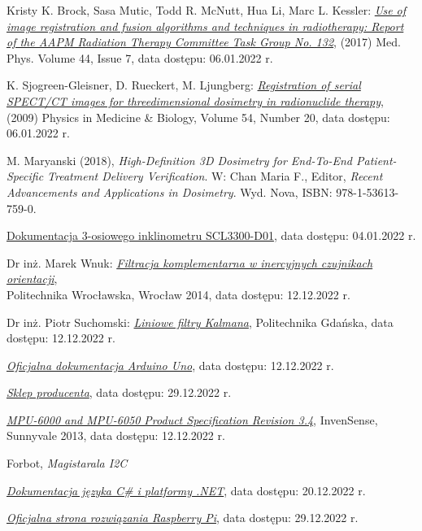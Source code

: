 
\begin{thebibliography}{3}
\small

Kristy K. Brock, Sasa Mutic, Todd R. McNutt, Hua Li, Marc L. Kessler: \href{https://aapm.onlinelibrary.wiley.com/doi/10.1002/mp.12256}{\emph{Use of image registration and fusion algorithms and techniques in radiotherapy: Report of the AAPM Radiation Therapy Committee Task Group No. 132}}, (2017) Med. Phys. Volume 44, Issue 7, data dostępu: 06.01.2022 r.

K. Sjogreen-Gleisner, D. Rueckert, M. Ljungberg: \href{https://iopscience.iop.org/article/10.1088/0031-9155/54/20/010/pdf}{\emph{Registration of serial SPECT/CT images for threedimensional dosimetry in radionuclide therapy}}, (2009) Physics in Medicine \& Biology, Volume 54, Number 20, data dostępu: 06.01.2022 r.

M. Maryanski (2018), \emph{High-Definition 3D Dosimetry for End-To-End Patient-Specific Treatment Delivery Verification}. W: Chan Maria F., Editor, \emph{Recent Advancements and Applications in Dosimetry}. Wyd. Nova, ISBN: 978-1-53613-759-0.

\href{https://www.mouser.pl/datasheet/2/281/1/datasheet_scl3300_d01-1532018.pdf}{Dokumentacja 3-osiowego inklinometru SCL3300-D01}, data dostępu: 04.01.2022 r.

Dr inż. Marek Wnuk: \href{http://docplayer.pl/47112054-Katedra-cybernetyki-i-robotyki-wydzial-elektroniki.html}{\emph{Filtracja komplementarna w inercyjnych czujnikach orientacji}}, \\
Politechnika Wrocławska, Wrocław 2014, data dostępu: 12.12.2022 r.

Dr inż. Piotr Suchomski: \href{https://eti.pg.edu.pl/documents/176593/26524402/TS-5.pdf}{\emph{Liniowe filtry Kalmana}},
Politechnika Gdańska, data dostępu: 12.12.2022 r.

\href{https://docs.arduino.cc/hardware/uno-rev3}{\emph{Oficjalna dokumentacja Arduino Uno}}, data dostępu: 12.12.2022 r.

\href{https://www.dfrobot.com/product-880.html}{\emph{Sklep producenta}}, data dostępu: 29.12.2022 r.

\href{https://invensense.tdk.com/wp-content/uploads/2015/02/MPU-6000-Datasheet1.pdf}{\emph{MPU-6000 and MPU-6050 Product Specification Revision 3.4}}, InvenSense, Sunnyvale 2013, data dostępu: 12.12.2022 r.

Forbot, \emph{Magistarala I2C}

\href{https://learn.microsoft.com/en-us/dotnet/api/system.threading.thread?view=net-7.0}{\emph{Dokumentacja języka C\# i platformy .NET}}, data dostępu: 20.12.2022 r.

\href{https://www.raspberrypi.com/products/raspberry-pi-4-model-b/}{\emph{Oficjalna strona rozwiązania Raspberry Pi}}, data dostępu: 29.12.2022 r.
\end{thebibliography}